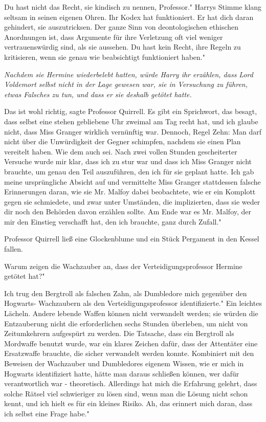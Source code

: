 \glqq Du hast nicht das Recht, sie kindisch zu nennen, Professor." Harrys Stimme
klang seltsam in seinen eigenen Ohren. \glqq Ihr Kodex hat funktioniert. Er hat
dich daran gehindert, sie auszutricksen. Der ganze Sinn von deontologischen
ethischen Anordnungen ist, dass Argumente für ihre Verletzung oft viel weniger
vertrauenswürdig sind, als sie aussehen. Du hast kein Recht, ihre Regeln zu
kritisieren, wenn sie genau wie beabsichtigt funktioniert haben."

\emph{Nachdem sie Hermine wiederbelebt hatten, würde Harry ihr erzählen, dass Lord Voldemort selbst nicht in der Lage gewesen war, sie in Versuchung zu führen, etwas Falsches zu tun, und dass er sie deshalb getötet hatte.}

\glqq Das ist wohl richtig\grqq{}, sagte Professor Quirrell. \glqq Es gibt ein
Sprichwort, das besagt, dass selbst eine stehen gebliebene Uhr zweimal am Tag
recht hat, und ich glaube nicht, dass Miss Granger wirklich vernünftig war.
Dennoch, Regel Zehn: Man darf nicht über die Unwürdigkeit der Gegner schimpfen,
nachdem sie einen Plan vereitelt haben. Wie dem auch sei. Nach zwei vollen
Stunden gescheiterter Versuche wurde mir klar, dass ich zu stur war und dass ich
Miss Granger nicht brauchte, um genau den Teil auszuführen, den ich für sie
geplant hatte. Ich gab meine ursprüngliche Absicht auf und vermittelte Miss
Granger stattdessen falsche Erinnerungen daran, wie sie Mr. Malfoy dabei
beobachtete, wie er ein Komplott gegen sie schmiedete, und zwar unter Umständen,
die implizierten, dass sie weder dir noch den Behörden davon erzählen sollte. Am
Ende war es Mr. Malfoy, der mir den Einstieg verschafft hat, den ich brauchte,
ganz durch Zufall."

Professor Quirrell ließ eine Glockenblume und ein Stück Pergament in den Kessel
fallen.

\glqq Warum zeigen die Wachzauber an, dass der Verteidigungsprofessor Hermine
getötet hat?"

\glqq Ich trug den Bergtroll als falschen Zahn, als Dumbledore mich gegenüber
den Hogwarts- Wachzaubern als den Verteidigungsprofessor identifizierte." Ein
leichtes Lächeln. \glqq Andere lebende Waffen können nicht verwandelt werden;
sie würden die Entzauberung nicht die erforderlichen sechs Stunden überleben, um
nicht von Zeitumkehrern aufgespürt zu werden. Die Tatsache, dass ein Bergtroll
als Mordwaffe benutzt wurde, war ein klares Zeichen dafür, dass der Attentäter
eine Ersatzwaffe brauchte, die sicher verwandelt werden konnte. Kombiniert mit
den Beweisen der Wachzauber und Dumbledores eigenem Wissen, wie er mich in
Hogwarts identifiziert hatte, hätte man daraus schließen können, wer dafür
verantwortlich war - theoretisch. Allerdings hat mich die Erfahrung gelehrt,
dass solche Rätsel viel schwieriger zu lösen sind, wenn man die Lösung nicht
schon kennt, und ich hielt es für ein kleines Risiko. Ah, das erinnert mich
daran, dass ich selbst eine Frage habe."


